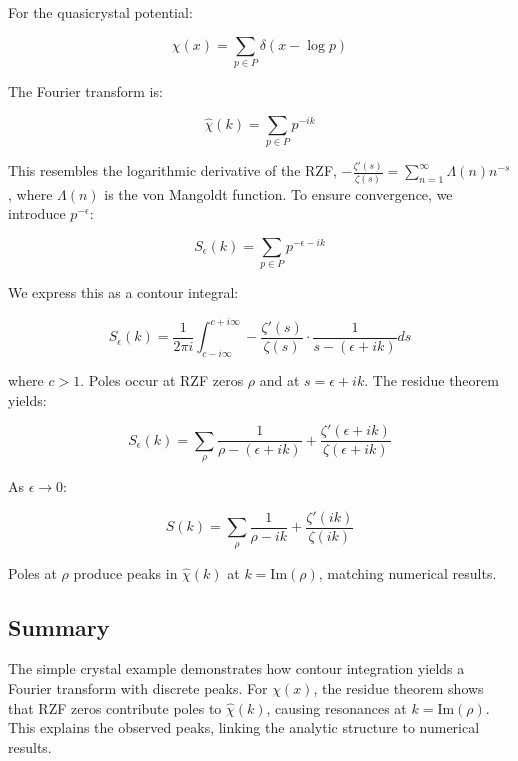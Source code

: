 \documentclass[11pt, oneside]{article}
\begin{document}
For the quasicrystal potential:

\begin{equation}
\chi(x) = \sum_{p \in P} \delta(x - \log p)
\end{equation}

The Fourier transform is:

\begin{equation}
\hat{\chi}(k) = \sum_{p \in P} p^{-ik}
\end{equation}

This resembles the logarithmic derivative of the RZF, $-\frac{\zeta'(s)}{\zeta(s)} = \sum_{n=1}^\infty \Lambda(n) n^{-s}$, where $\Lambda(n)$ is the von Mangoldt function. To ensure convergence, we introduce $p^{-\epsilon}$:

\begin{equation}
S_\epsilon(k) = \sum_{p \in P} p^{-\epsilon - ik}
\end{equation}

We express this as a contour integral:

\begin{equation}
S_\epsilon(k) = \frac{1}{2\pi i} \int_{c - i \infty}^{c + i \infty} -\frac{\zeta'(s)}{\zeta(s)} \cdot \frac{1}{s - (\epsilon + ik)} ds
\end{equation}

where $c > 1$. Poles occur at RZF zeros $\rho$ and at $s = \epsilon + ik$. The residue theorem yields:

\begin{equation}
S_\epsilon(k) = \sum_{\rho} \frac{1}{\rho - (\epsilon + ik)} + \frac{\zeta'(\epsilon + ik)}{\zeta(\epsilon + ik)}
\end{equation}

As $\epsilon \to 0$:

\begin{equation}
S(k) = \sum_{\rho} \frac{1}{\rho - ik} + \frac{\zeta'(ik)}{\zeta(ik)}
\end{equation}

Poles at $\rho$ produce peaks in $\hat{\chi}(k)$ at $k = \text{Im}(\rho)$, matching numerical results.

\subsection{Summary}

The simple crystal example demonstrates how contour integration yields a Fourier transform with discrete peaks. For $\chi(x)$, the residue theorem shows that RZF zeros contribute poles to $\hat{\chi}(k)$, causing resonances at $k = \text{Im}(\rho)$. This explains the observed peaks, linking the analytic structure to numerical results.
\end{document}
